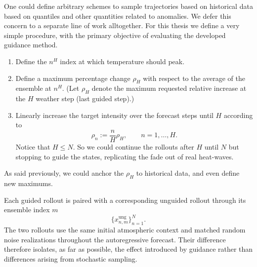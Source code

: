 One could define arbitrary schemes to sample trajectories based on historical data based on quantiles and other quantities related to anomalies.
We defer this concern to a separate line of work alltogether.
For this thesis we define a very simple procedure, with the primary objective of evaluating the developed guidance method.
\begin{enumerate}[noitemsep]
    \item Define the $n^H$ index at which temperature should peak.
    \item Define a maximum percentage change \(\rho_{H}\) with respect to the average of the ensemble at $n^H$. (Let \(\rho_{H}\) denote the maximum requested relative increase at the $H$
        weather step (last guided step).)
    \item 
        Linearly increase the target intensity over the forecast steps until $H$ according
        to
        \begin{equation}
            \rho_n
            :=
            \frac{n}{H}\rho_H,
            \qquad
            n=1,\ldots,H.
            \label{eq:relative-target-schedule}
        \end{equation}
        Notice that $H \leq N$. So we could continue the rollouts after $H$ until $N$ but stopping to guide the states, replicating the fade out of real heat-waves.

\end{enumerate}

As said previously, we could anchor the $\rho_H$ to historical data, and even define new maximums.

Each guided rollout is paired with a corresponding unguided rollout through its ensemble index $m$
\[
    \{x_{n,m}^{\mathrm{ung}}\}_{n=1}^N.
\]
The two rollouts use the same initial atmospheric context and matched random
noise realizations throughout the autoregressive forecast.
Their difference therefore isolates, as far as possible, the effect introduced
by guidance rather than differences arising from stochastic sampling.




